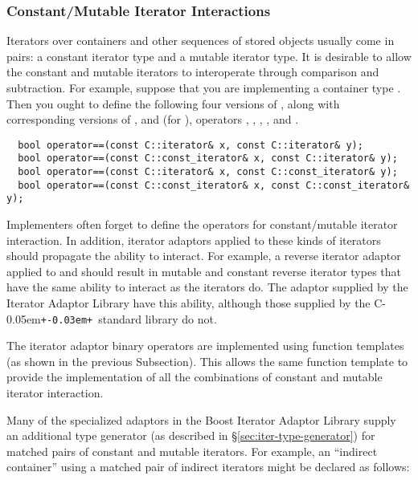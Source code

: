 \documentclass{netobjectdays}
\newcommand{\Cpp}{C\kern-0.05em\texttt{+\kern-0.03em+}}
\newcommand{\reverseiterator}{\code{reverse\_\-iterator}}
\begin{document}
\subsubsection{Constant/Mutable Iterator Interactions}
\label{sec:constant-mutable-iterations}

Iterators over containers and other sequences of stored objects
usually come in pairs: a constant iterator type and a mutable iterator
type. It is desirable to allow the constant and mutable iterators to
interoperate through comparison and subtraction. For example, suppose
that you are implementing a container type . Then you ought to
define the following four versions of , along with
corresponding versions of , and (for
), operators \code{<}, \code{>},
\code{<=}, \code{>=}, and \code{-}.

{\footnotesize
\begin{verbatim}
  bool operator==(const C::iterator& x, const C::iterator& y);
  bool operator==(const C::const_iterator& x, const C::iterator& y);
  bool operator==(const C::iterator& x, const C::const_iterator& y);
  bool operator==(const C::const_iterator& x, const C::const_iterator& y);
\end{verbatim}
}

Implementers often forget to define the operators for constant/mutable
iterator interaction. In addition, iterator adaptors applied to these
kinds of iterators should propagate the ability to interact. For
example, a reverse iterator adaptor applied to  and
 should result in mutable and constant
reverse iterator types that have the same ability to interact as the
 iterators do. The \reverseiterator{} adaptor supplied by
the Iterator Adaptor Library have this ability, although those
supplied by the \Cpp\ standard library do not.

The iterator adaptor binary operators are implemented using function
templates (as shown in the previous Subsection). This allows the same
function template to provide the implementation of all the
combinations of constant and mutable iterator interaction.

Many of the specialized adaptors in the Boost Iterator Adaptor Library supply an
additional type generator (as described in \S\ref{sec:iter-type-generator}) for
matched pairs of constant and mutable iterators. For example, an ``indirect
container'' using a matched pair of indirect iterators might be declared as
follows:
\end{document}
